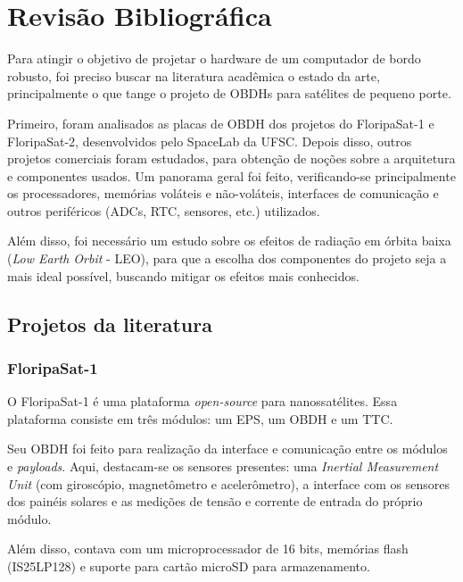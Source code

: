 \chapter{Revisão Bibliográfica}

Para atingir o objetivo de projetar o hardware de um computador de bordo robusto, foi preciso buscar na literatura acadêmica o estado da arte, principalmente o que tange o projeto de OBDHs para satélites de pequeno porte. 

Primeiro, foram analisados as placas de OBDH dos projetos do FloripaSat-1 e FloripaSat-2, desenvolvidos pelo SpaceLab da UFSC. Depois disso, outros projetos comerciais foram estudados, para obtenção de noções sobre a arquitetura e componentes usados. Um panorama geral foi feito, verificando-se principalmente os processadores, memórias voláteis e não-voláteis, interfaces de comunicação e outros periféricos (ADCs, RTC, sensores, etc.) utilizados. 

Além disso, foi necessário um estudo sobre os efeitos de radiação em órbita baixa (\textit{Low Earth Orbit} - LEO), para que a escolha dos componentes do projeto seja a mais ideal possível, buscando mitigar os efeitos mais conhecidos.

\section{Projetos da literatura}

\subsection{FloripaSat-1}
O FloripaSat-1 é uma plataforma \textit{open-source} para nanossatélites. Essa plataforma consiste em três módulos: um EPS, um OBDH e um TTC.

Seu OBDH foi feito para realização da interface e comunicação entre os módulos e \textit{payloads}. Aqui, destacam-se os sensores presentes: uma \textit{Inertial Measurement Unit} (com giroscópio, magnetômetro e acelerômetro), a interface com os sensores dos painéis solares e as medições de tensão e corrente de entrada do próprio módulo.

Além disso, contava com um microprocessador de 16 bits, memórias flash (IS25LP128) e suporte para cartão microSD para armazenamento.

